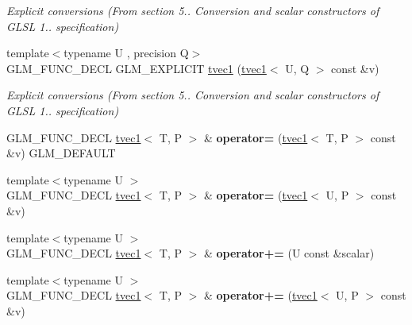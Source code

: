 \begin{DoxyCompactItemize}
\begin{DoxyCompactList}\small\item\em Explicit conversions (From section 5.. Conversion and scalar constructors of G\-L\-S\-L 1.. specification) \end{DoxyCompactList}\item 
\hypertarget{structglm_1_1tvec1_a91828fdb1181e3e95e990aaf23b2db46}{{\footnotesize template$<$typename U , precision Q$>$ }\\G\-L\-M\-\_\-\-F\-U\-N\-C\-\_\-\-D\-E\-C\-L G\-L\-M\-\_\-\-E\-X\-P\-L\-I\-C\-I\-T \hyperlink{structglm_1_1tvec1_a91828fdb1181e3e95e990aaf23b2db46}{tvec1} (\hyperlink{structglm_1_1tvec1}{tvec1}$<$ U, Q $>$ const \&v)}\label{structglm_1_1tvec1_a91828fdb1181e3e95e990aaf23b2db46}

\begin{DoxyCompactList}\small\item\em Explicit conversions (From section 5.. Conversion and scalar constructors of G\-L\-S\-L 1.. specification) \end{DoxyCompactList}\item 
\hypertarget{structglm_1_1tvec1_a317f46cddcdf81865c4970004e294055}{G\-L\-M\-\_\-\-F\-U\-N\-C\-\_\-\-D\-E\-C\-L \hyperlink{structglm_1_1tvec1}{tvec1}$<$ T, P $>$ \& {\bfseries operator=} (\hyperlink{structglm_1_1tvec1}{tvec1}$<$ T, P $>$ const \&v) G\-L\-M\-\_\-\-D\-E\-F\-A\-U\-L\-T}\label{structglm_1_1tvec1_a317f46cddcdf81865c4970004e294055}

\item 
\hypertarget{structglm_1_1tvec1_a472b0f4afb1f9efd1769597027a399f0}{{\footnotesize template$<$typename U $>$ }\\G\-L\-M\-\_\-\-F\-U\-N\-C\-\_\-\-D\-E\-C\-L \hyperlink{structglm_1_1tvec1}{tvec1}$<$ T, P $>$ \& {\bfseries operator=} (\hyperlink{structglm_1_1tvec1}{tvec1}$<$ U, P $>$ const \&v)}\label{structglm_1_1tvec1_a472b0f4afb1f9efd1769597027a399f0}

\item 
\hypertarget{structglm_1_1tvec1_ad78be8c834e796c8bcd72d4b2b0a8b42}{{\footnotesize template$<$typename U $>$ }\\G\-L\-M\-\_\-\-F\-U\-N\-C\-\_\-\-D\-E\-C\-L \hyperlink{structglm_1_1tvec1}{tvec1}$<$ T, P $>$ \& {\bfseries operator+=} (U const \&scalar)}\label{structglm_1_1tvec1_ad78be8c834e796c8bcd72d4b2b0a8b42}

\item 
\hypertarget{structglm_1_1tvec1_af0d6bb22d35f767a748be6fa086c4911}{{\footnotesize template$<$typename U $>$ }\\G\-L\-M\-\_\-\-F\-U\-N\-C\-\_\-\-D\-E\-C\-L \hyperlink{structglm_1_1tvec1}{tvec1}$<$ T, P $>$ \& {\bfseries operator+=} (\hyperlink{structglm_1_1tvec1}{tvec1}$<$ U, P $>$ const \&v)}\label{structglm_1_1tvec1_af0d6bb22d35f767a748be6fa086c4911}


\end{DoxyCompactItemize}

